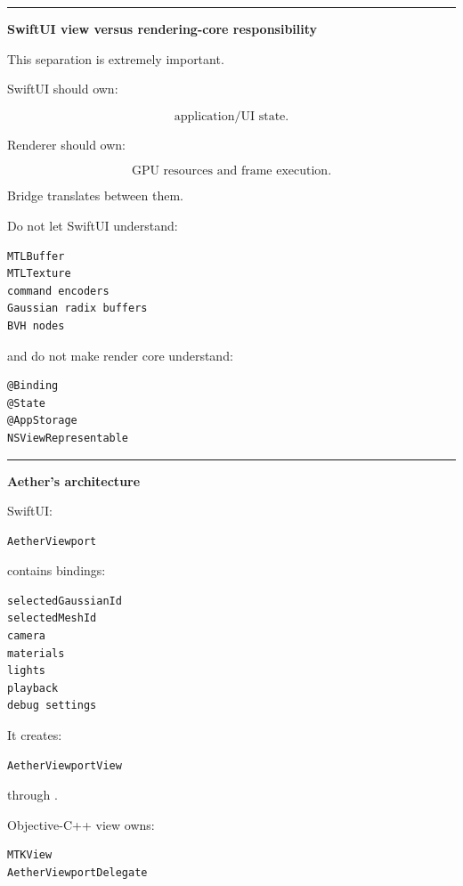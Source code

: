 \begin{center}\rule{0.5\linewidth}{0.5pt}\end{center}

\textbf{SwiftUI view versus rendering-core responsibility}

This separation is extremely important.

SwiftUI should own:

\[
\text{application/UI state}.
\]

Renderer should own:

\[
\text{GPU resources and frame execution}.
\]

Bridge translates between them.

Do not let SwiftUI understand:

\begin{verbatim}
MTLBuffer
MTLTexture
command encoders
Gaussian radix buffers
BVH nodes
\end{verbatim}

and do not make render core understand:

\begin{verbatim}
@Binding
@State
@AppStorage
NSViewRepresentable
\end{verbatim}

\begin{center}\rule{0.5\linewidth}{0.5pt}\end{center}

\textbf{Aether's architecture}

SwiftUI:

\begin{verbatim}
AetherViewport
\end{verbatim}

contains bindings:

\begin{verbatim}
selectedGaussianId
selectedMeshId
camera
materials
lights
playback
debug settings
\end{verbatim}

It creates:

\begin{verbatim}
AetherViewportView
\end{verbatim}

through .

Objective-C++ view owns:

\begin{verbatim}
MTKView
AetherViewportDelegate
\end{verbatim}

